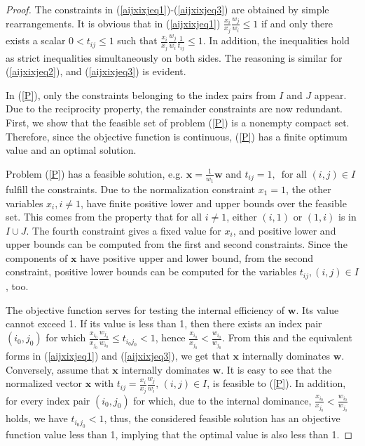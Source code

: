 \documentclass{article}
\theoremstyle{plain}
\begin{document}
\begin{proof}
The constraints in (\ref{aijxixjeq1})-(\ref{aijxixjeq3}) are obtained by simple rearrangements. It is obvious that in (\ref{aijxixjeq1})
 $\frac{x_i}{x_j} \frac{w_j}{w_i} \leq 1$
if and only there exists a scalar
$0 < t_{ij} {\leq} 1$ such that
$\frac{x_i}{x_j} \frac{w_j}{w_i} \frac{1}{t_{ij}}\le 1$. In addition, the inequalities hold as strict inequalities simultaneously on both sides. The reasoning is similar for (\ref{aijxixjeq2}), and (\ref{aijxixjeq3}) is evident.

In (\ref{P}), only the constraints belonging to the index pairs from $I$ and $J$ appear. Due to the reciprocity property, the remainder constraints are now redundant. First, we show that the feasible set of problem (\ref{P}) is a nonempty compact set. Therefore, since the objective function is continuous, (\ref{P}) has a f{\kern0pt}inite optimum value and an optimal solution.

Problem (\ref{P}) has a feasible solution, e.g. $\mathbf{x}=\frac{1}{w_1}\mathbf{w}$ and $t_{ij}=1,\,\text{ for all } (i,j)\in I$ fulf{\kern0pt}ill the constraints. Due to the normalization constraint $x_1=1$, the other variables $x_i, i\ne 1$, have  f{\kern0pt}inite positive lower and upper bounds over the feasible set. This comes from the property that for all $i\ne 1$, either $(i,1)$ or $(1,i)$ is in $I\cup J$. The fourth constraint gives a f{\kern0pt}ixed value for $x_i$, and  positive lower and upper bounds can be computed from the f{\kern0pt}irst and second constraints. Since the components of $\mathbf{x}$ have positive upper and lower bound, from the second constraint, positive lower bounds can be computed for the variables $t_{ij}, (i,j)\in I$, too.

The objective function serves for testing the internal ef{\kern0pt}f{\kern0pt}iciency  of  $\mathbf{w}$. Its value cannot exceed 1.
If its value is less than 1, then there exists an index pair
$(i_0, j_0)$ for which %
$\frac{x_{i_0}}{x_{j_0}} \frac{w_{j_0}}{w_{i_0}}\le t_{{i_0}{j_0}}<1$,
hence $\frac{x_{i_0}}{x_{j_0}}<\frac{w_{i_0}}{w_{j_0}}$. From this and the equivalent forms in (\ref{aijxixjeq1}) and (\ref{aijxixjeq3}), we get that $\mathbf{x}$ internally dominates $\mathbf{w}$. Conversely, assume that $\mathbf{x}$ internally dominates $\mathbf{w}$. It is easy to see that the normalized vector $\mathbf{x}$ with
$t_{{i}{j}} = \frac{x_{i}}{x_{j}} \frac{w_{j}}{w_{i}},\,(i,j)\in I$, is feasible to (\ref{P}). In addition, for every index pair $(i_0, j_0)$ for which, due to the internal dominance,  $\frac{x_{i_0}}{x_{j_0}}<\frac{w_{i_0}}{w_{j_0}}$ holds, we have $t_{{i_0}{j_0}}<1$, thus, the considered feasible solution has an objective function value less than 1, implying that the optimal value is also less than 1.


\end{proof}
\end{document}
